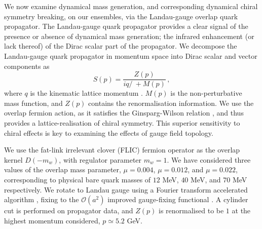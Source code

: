 \documentclass[
 reprint,
 amsmath,amssymb,
 aps,
prd,
]{revtex4-1}
\begin{document}
We now examine dynamical mass generation, and corresponding dynamical chiral symmetry breaking, on our ensembles, via the Landau-gauge overlap quark propagator. The Landau-gauge quark propagator provides a clear signal of the presence or absence of dynamical mass generation; the infrared enhancement (or lack thereof) of the Dirac scalar part of the propagator. We decompose the Landau-gauge quark propagator in momentum space into Dirac scalar and vector components as \cite{Bonnet:2002ih,Kamleh:2004aw}
\begin{equation}
S(p) = \frac{Z(p)}{iq\!\!\!/\ + M(p)}\, ,
\end{equation}
where $q$ is the kinematic lattice momentum \cite{Bonnet:2002ih}. $M(p)$ is the non-perturbative mass function, and $Z(p)$ contains the renormalisation information. We use the overlap fermion action, as it satisfies the Ginsparg-Wilson relation \cite{Ginsparg:1981bj}, and thus provides a lattice-realisation of chiral symmetry. This superior sensitivity to chiral effects is key to examining the effects of gauge field topology.\par 
We use the fat-link irrelevant clover (FLIC) fermion operator \cite{Zanotti:2001yb,Kamleh:2004aw,Kamleh:2004xk,Kamleh:2001ff} as the overlap kernel $D(-m_{w})$, with regulator parameter $m_{w} = 1$. We have considered three values of the overlap mass parameter, $\mu = 0.004$, $\mu = 0.012$, and $\mu = 0.022$, corresponding to physical bare quark masses of $12$ MeV, $40$ MeV, and $70$ MeV respectively. We rotate to Landau gauge using a Fourier transform accelerated algorithm \cite{Davies:1987vs}, fixing to the $\mathcal{O}(a^2)$ improved gauge-fixing functional \cite{Bonnet:1999mj}. A cylinder cut \cite{Leinweber:1998im} is performed on propagator data, and $Z(p)$ is renormalised to be $1$ at the highest momentum considered, $p \simeq 5.2$ GeV. \par
\renewcommand\thesubfigure{\alph{subfigure}}
\end{document}
